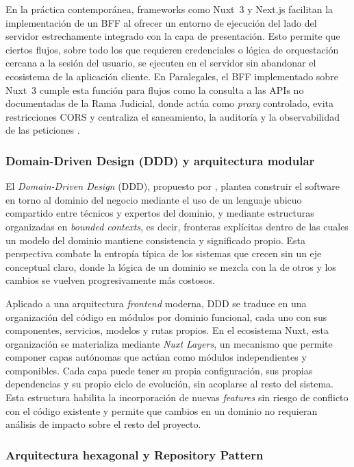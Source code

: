 En la práctica contemporánea, frameworks como Nuxt~3 y Next.js facilitan la implementación de un BFF al ofrecer un entorno de ejecución del lado del servidor estrechamente integrado con la capa de presentación. Esto permite que ciertos flujos, sobre todo los que requieren credenciales o lógica de orquestación cercana a la sesión del usuario, se ejecuten en el servidor sin abandonar el ecosistema de la aplicación cliente. En Paralegales, el BFF implementado sobre Nuxt~3 cumple esta función para flujos como la consulta a las APIs no documentadas de la Rama Judicial, donde actúa como \textit{proxy} controlado, evita restricciones CORS y centraliza el saneamiento, la auditoría y la observabilidad de las peticiones \cite{Newman2021}.

\subsubsection{Domain-Driven Design (DDD) y arquitectura modular}

El \textit{Domain-Driven Design} (DDD), propuesto por \textcite{Evans2003}, plantea construir el software en torno al dominio del negocio mediante el uso de un lenguaje ubicuo compartido entre técnicos y expertos del dominio, y mediante estructuras organizadas en \textit{bounded contexts}, es decir, fronteras explícitas dentro de las cuales un modelo del dominio mantiene consistencia y significado propio. Esta perspectiva combate la entropía típica de los sistemas que crecen sin un eje conceptual claro, donde la lógica de un dominio se mezcla con la de otros y los cambios se vuelven progresivamente más costosos.

Aplicado a una arquitectura \textit{frontend} moderna, DDD se traduce en una organización del código en módulos por dominio funcional, cada uno con sus componentes, servicios, modelos y rutas propios. En el ecosistema Nuxt, esta organización se materializa mediante \textit{Nuxt Layers}, un mecanismo que permite componer capas autónomas que actúan como módulos independientes y componibles. Cada capa puede tener su propia configuración, sus propias dependencias y su propio ciclo de evolución, sin acoplarse al resto del sistema. Esta estructura habilita la incorporación de nuevas \textit{features} sin riesgo de conflicto con el código existente y permite que cambios en un dominio no requieran análisis de impacto sobre el resto del proyecto.

\subsubsection{Arquitectura hexagonal y Repository Pattern}

